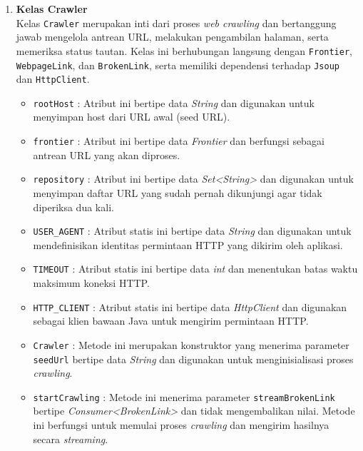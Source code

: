 \begin{enumerate}
    \item \textbf{Kelas Crawler}\\
    Kelas \texttt{Crawler} merupakan inti dari proses \textit{web crawling} dan bertanggung jawab mengelola antrean URL, melakukan pengambilan halaman, serta memeriksa status tautan. Kelas ini berhubungan langsung dengan \texttt{Frontier}, \texttt{WebpageLink}, dan \texttt{BrokenLink}, serta memiliki dependensi terhadap \texttt{Jsoup} dan \texttt{HttpClient}.
    \begin{itemize}

        \item \texttt{rootHost} : Atribut ini bertipe data \textit{String} dan digunakan untuk menyimpan host dari URL awal (seed URL).
        
        \item \texttt{frontier} : Atribut ini bertipe data \textit{Frontier} dan berfungsi sebagai antrean URL yang akan diproses.
        
        \item \texttt{repository} : Atribut ini bertipe data \textit{Set<String>} dan digunakan untuk menyimpan daftar URL yang sudah pernah dikunjungi agar tidak diperiksa dua kali.
        
        \item \texttt{USER\_AGENT} : Atribut statis ini bertipe data \textit{String} dan digunakan untuk mendefinisikan identitas permintaan HTTP yang dikirim oleh aplikasi.
        
        \item \texttt{TIMEOUT} : Atribut statis ini bertipe data \textit{int} dan menentukan batas waktu maksimum koneksi HTTP.
        
        \item \texttt{HTTP\_CLIENT} : Atribut statis ini bertipe data \textit{HttpClient} dan digunakan sebagai klien bawaan Java untuk mengirim permintaan HTTP.

        \item \texttt{Crawler} : Metode ini merupakan konstruktor yang menerima parameter \texttt{seedUrl} bertipe data \textit{String} dan digunakan untuk menginisialisasi proses \textit{crawling}.
        
        \item \texttt{startCrawling} : Metode ini menerima parameter \texttt{streamBrokenLink} bertipe \textit{Consumer<BrokenLink>} dan tidak mengembalikan nilai. Metode ini berfungsi untuk memulai proses \textit{crawling} dan mengirim hasilnya secara \textit{streaming}.
        

\end{itemize}
\end{enumerate}
